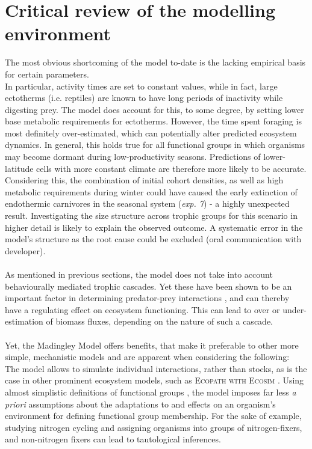 \section{Critical review of the modelling environment}
The most obvious shortcoming of the model to-date is the lacking empirical basis for certain parameters. \\
In particular, activity times are set to constant values, while in fact, large ectotherms (i.e. reptiles) are known to have long periods of inactivity while digesting prey. 
The model does account for this, to some degree, by setting lower base metabolic requirements for ectotherms. However, the time spent foraging is most definitely over-estimated, which can potentially alter predicted ecosystem dynamics. 
In general, this holds true for all functional groups in which organisms may become dormant during low-productivity seasons. Predictions of lower-latitude cells with more constant climate are therefore more likely to be accurate. \\
Considering this, the combination of initial cohort densities, as well as high metabolic requirements during winter could have  caused the early extinction of endothermic carnivores in the seasonal system (\textit{exp. 7}) - a highly unexpected result. Investigating the size structure across trophic groups for this scenario in higher detail is likely to explain the observed outcome. A systematic error in the model's structure as the root cause could be excluded (oral communication with developer).
\\\\
As mentioned in previous sections, the model does not take into account behaviourally mediated trophic cascades. Yet these have been shown to be an important factor in determining predator-prey interactions \citep[e.g][]{Fortin2005,Duffy2007,Beschta2009}, and can thereby have a regulating effect on ecosystem functioning. This can lead to over or under-estimation of biomass fluxes, depending on the nature of such a cascade.
\\\\
Yet, the Madingley Model offers benefits, that make it preferable to other more simple, mechanistic models and are apparent when considering the following:\\
The model allows to simulate individual interactions, rather than stocks, as is the case in other prominent ecosystem models, such as \textsc{Ecopath with Ecosim} \citep{Christensen2004}. Using almost simplistic definitions of functional groups \citep[cf.][for other defintions]{Hooper2002}, the model imposes far less \textit{a priori} assumptions about the adaptations to and effects on an organism's environment for defining functional group membership. For the sake of example, studying nitrogen cycling and assigning organisms into groups of nitrogen-fixers, and non-nitrogen fixers can lead to tautological inferences.\\
